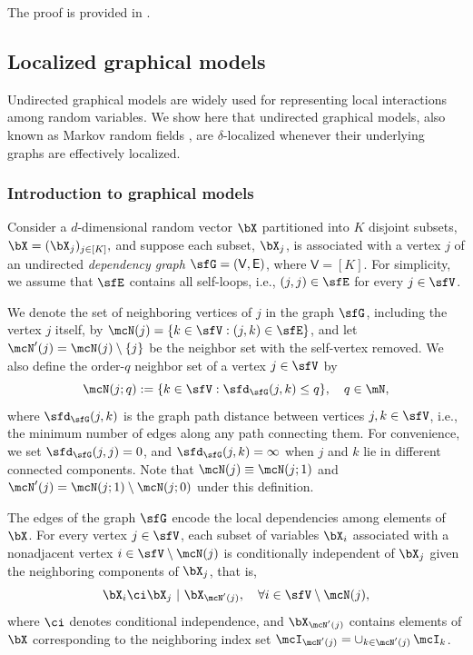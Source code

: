 \documentclass[11pt]{article}
\begin{document}
\noindent The proof is provided in .

\subsection{Localized graphical models}
\label{sec:LGM}

Undirected graphical models \cite{MR2778120} are widely used for representing local interactions among random variables. We show here that undirected graphical models, also known as Markov random fields \cite{clifford1990markov}, are $\delta$-localized whenever their underlying graphs are effectively localized.

\subsubsection{Introduction to graphical models}
\label{sec:Intro_GM}


Consider a $d$-dimensional random vector $\bX$ partitioned into $K$ disjoint subsets,
\(
    \bX = (\bX_j)_{j \in [K]},
\)
and suppose each subset, $\bX_j$, is associated with a vertex $j$ of an undirected \emph{dependency graph} $\sfG = (\mathsf{V}, \mathsf{E})$, where $\mathsf{V} = [K]$. 
%
For simplicity, we assume that $\sfE$ contains all self-loops, i.e., $(j,j)\in \sfE$ for every $j \in \sfV$.



We denote the set of neighboring vertices of $j$ in the graph $\sfG$, including the vertex $j$ itself, by $\mcN(j) = \{k \in \sfV: (j,k)\in \sfE\} $, and let $\mcN'(j) = \mcN(j) \setminus \{j\}$ be the neighbor set with the self-vertex removed. We also define the order-$q$ neighbor set of a vertex $j\in \sfV$ by
\begin{equation}
    \mcN(j;q) := \{ k \in \sfV: \sfd_\sfG(j,k) \le q \}, \quad q \in \mN, 
\end{equation}
where $\sfd_\sfG(j,k)$ is the graph path distance between vertices $j,k\in \sfV$, i.e., the minimum number of edges along any path connecting them. For convenience, we set $\sfd_\sfG(j,j)=0$, and $\sfd_\sfG(j,k)=\infty$ when $j$ and $k$ lie in different connected components.
Note that $\mcN(j) \equiv \mcN(j;1)$ and $\mcN'(j) = \mcN(j; 1) \setminus \mcN(j;0)$ under this definition.



The edges of the graph $\sfG$ encode the local dependencies among elements of $\bX$. For every vertex $j \in \sfV$, each subset of variables \(\bX_i\) associated with a nonadjacent vertex $i \in \sfV \setminus \mcN(j)$ is conditionally independent of $\bX_j$ given the neighboring components of $\bX_j$, that is, 
\begin{equation}
\label{eqn:MRF}
    \bX_i \ci \bX_j ~|~ \bX_{\smash{\mcN'(j)}}, \quad \forall i \in \sfV \setminus \mcN(j),
\end{equation}
where $\ci$ denotes conditional independence, and $\bX_{\smash{\mcN'(j)}}$ contains elements of $\bX$ corresponding to the neighboring index set $\mcI_{\smash{\mcN'(j)}} = \cup_{k \in \smash{\mcN'(j)}} \,\mcI_k$.
\end{document}
